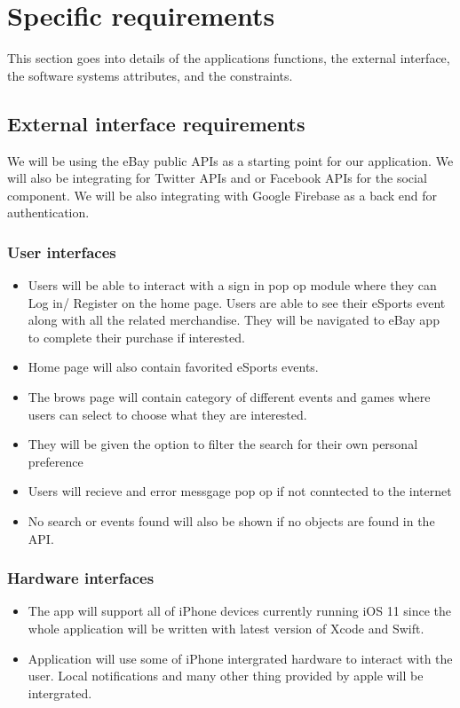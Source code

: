 \documentclass[onecolumn, draftclsnofoot,10pt, compsoc]{IEEEtran}
\begin{document}
\section{Specific requirements}
This section goes into details of the applications functions, the external interface, the software systems attributes, and the constraints.

\subsection{External interface requirements}
We will be using the eBay public APIs as a starting point for our application. We will also be integrating for Twitter APIs and or Facebook APIs for the social component. We will be also integrating with Google Firebase as a back end for authentication. 

\subsubsection{User interfaces}

\begin{itemize}
\item Users will be able to interact with a sign in pop op module where they can Log in/ Register
on the home page. Users are able to see their eSports event along with all the related merchandise. They will be navigated to eBay app to complete their purchase if interested.
\item Home page will also contain favorited eSports events.
\item The brows page will contain category of different events and games where users can select to choose what they are interested. 
\item They will be given the option to filter the search for their own personal preference
\item Users will recieve and error messgage pop op if not conntected to the internet
\item No search or events found will also be shown if no objects are found in the API.
\end{itemize}

\subsubsection{Hardware interfaces}
\begin{itemize}
\item The app will support all of iPhone devices currently running iOS 11 since the whole application will be written with latest version of Xcode and Swift.
\item Application will use some of iPhone intergrated hardware to interact with the user. Local notifications and many other thing provided by apple will be intergrated. 
\end{itemize}
\end{document}
